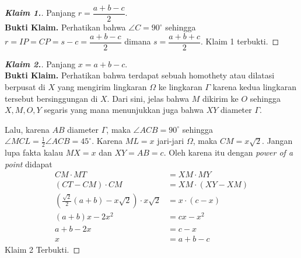 \begin{center}
    \end{center}

    \newpage
    \begin{proof}[\textbf{Klaim 1.}] Panjang $r = \dfrac{a+b-c}{2}$.\\
        \textbf{Bukti Klaim.} Perhatikan bahwa $\angle C = 90^\circ$ sehingga $r = IP = CP = s-c = \dfrac{a+b-c}{2}$ dimana $s = \dfrac{a+b+c}{2}$. Klaim 1 terbukti.
    \end{proof}
    \hrulefill
    \begin{proof}[\textbf{Klaim 2.}] Panjang $x = a+b-c$.\\
        \textbf{Bukti Klaim.} Perhatikan bahwa terdapat sebuah homothety atau dilatasi berpusat di $X$ yang mengirim lingkaran $\Omega$ ke lingkaran $\Gamma$ karena kedua lingkaran tersebut bersinggungan di $X$. Dari sini, jelas bahwa $M$ dikirim ke $O$ sehingga $X,M,O,Y$ segaris yang mana menunjukkan juga bahwa $XY$ diameter $\Gamma$. 
        
        Lalu, karena $AB$ diameter $\Gamma$, maka $\angle ACB = 90^\circ$ sehingga $\angle MCL = \frac{1}{2}\angle ACB = 45^\circ$. Karena $ML = x$ jari-jari $\Omega$, maka $CM = x\sqrt{2}$. Jangan lupa fakta kalau $MX = x$ dan $XY=AB=c$. Oleh karena itu dengan \textit{power of a point} didapat
        \begin{align*}
            CM \cdot MT &= XM \cdot MY\\
            (CT - CM) \cdot CM &= XM \cdot (XY - XM)\\
            (\frac{\sqrt{2}}{2}(a+b) - x\sqrt{2}) \cdot x\sqrt{2} &= x \cdot (c - x)\\
            (a+b)x - 2x^2 &= cx - x^2\\
            a+b - 2x &= c - x\\
            x &= a+b -c
        \end{align*}
        Klaim 2 Terbukti.
    \end{proof}
    
